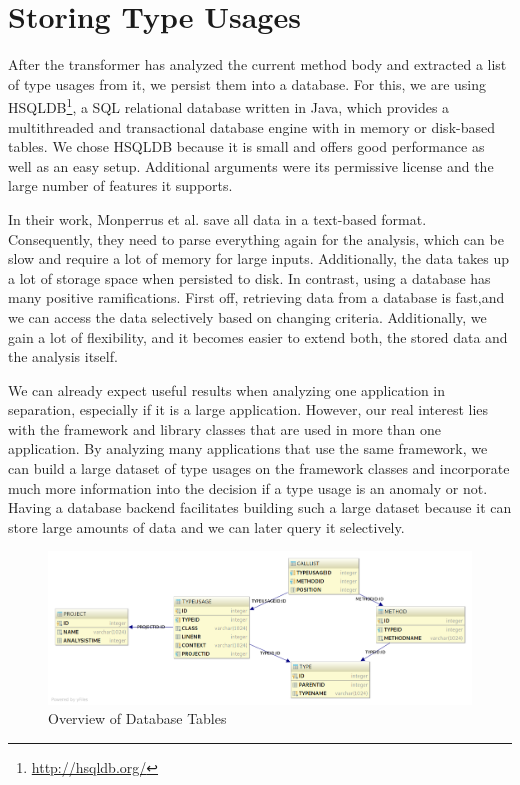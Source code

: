 \section{Storing Type Usages}

After the transformer has analyzed the current method body and extracted a list of type usages from it, we persist them into a database.
For this, we are using HSQLDB\footnote{\url{http://hsqldb.org/}}, a SQL relational database written in Java, which provides a multithreaded and transactional database engine with in memory or disk-based tables.
We chose HSQLDB because it is small and offers good performance as well as an easy setup.
Additional arguments were its permissive license and the large number of features it supports.

In their work, Monperrus et al. save all data in a text-based format.
Consequently, they need to parse everything again for the analysis, which can be slow and require a lot of memory for large inputs.
Additionally, the data takes up a lot of storage space when persisted to disk.
In contrast, using a database has many positive ramifications.
First off, retrieving data from a database is fast,and we can access the data selectively based on changing criteria.
Additionally, we gain a lot of flexibility, and it becomes easier to extend both, the stored data and the analysis itself.

We can already expect useful results when analyzing one application in separation, especially if it is a large application.
However, our real interest lies with the framework and library classes that are used in more than one application.
By analyzing many applications that use the same framework, we can build a large dataset of type usages on the framework classes and incorporate much more information into the decision if a type usage is an anomaly or not.
Having a database backend facilitates building such a large dataset because it can store large amounts of data and we can later query it selectively.

\begin{figure}[t]
    \centering
    \includegraphics[width=\textwidth]{figures/database_layout-light}
    \caption{Overview of Database Tables}
    \label{fig:db_layout}
\end{figure}

